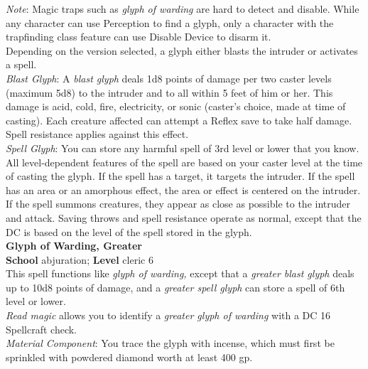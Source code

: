 \textit{Note}: Magic traps such as \textit{glyph of warding }are hard to detect and disable. While any character can use Perception to find a glyph, only a character with the trapfinding class feature can use Disable Device to disarm it.\\
Depending on the version selected, a glyph either blasts the intruder or activates a spell.\\
\textit{Blast Glyph}: A \textit{blast glyph }deals 1d8 points of damage per two caster levels (maximum 5d8) to the intruder and to all within 5 feet of him or her. This damage is acid, cold, fire, electricity, or sonic (caster's choice, made at time of casting). Each creature affected can attempt a Reflex save to take half damage. Spell resistance applies against this effect.\\
\textit{Spell Glyph}: You can store any harmful spell of 3rd level or lower that you know. All level-dependent features of the spell are based on your caster level at the time of casting the glyph\textit{. }If the spell has a target, it targets the intruder. If the spell has an area or an amorphous effect, the area or effect is centered on the intruder. If the spell summons creatures, they appear as close as possible to the intruder and attack. Saving throws and spell resistance operate as normal, except that the DC is based on the level of the spell stored in the glyph.\\
\textbf{Glyph of Warding, Greater}\\
\textbf{School} abjuration; \textbf{Level} cleric 6\\
This spell functions like \textit{glyph of warding, }except that a \textit{greater blast glyph }deals up to 10d8 points of damage, and a \textit{greater spell glyph }can store a spell of 6th level or lower.\\
\textit{Read magic} allows you to identify a \textit{greater glyph of warding} with a DC 16 Spellcraft check.\\
\textit{Material Component}: You trace the glyph with incense, which must first be sprinkled with powdered diamond worth at least 400 gp.\\

